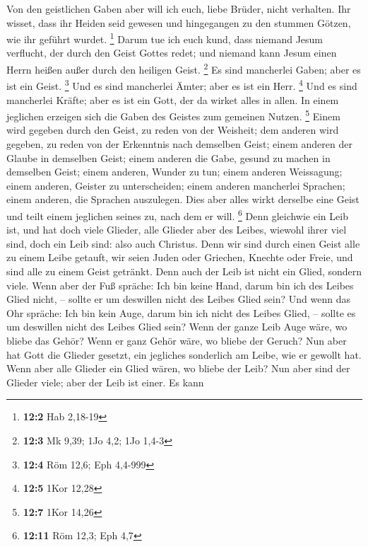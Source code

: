  Von den geistlichen Gaben aber will ich euch, liebe
Brüder, nicht verhalten.  Ihr wisset, dass ihr Heiden seid
gewesen und hingegangen zu den stummen Götzen, wie ihr geführt wurdet.
\footnote{\textbf{12:2} Hab 2,18-19}  Darum tue ich euch
kund, dass niemand Jesum verflucht, der durch den Geist Gottes redet;
und niemand kann Jesum einen Herrn heißen außer durch den heiligen
Geist. \footnote{\textbf{12:3} Mk 9,39; 1Jo 4,2; 1Jo 1,4-3}
 Es sind mancherlei Gaben; aber es ist ein Geist.
\footnote{\textbf{12:4} Röm 12,6; Eph 4,4-999}  Und es
sind mancherlei Ämter; aber es ist ein Herr. \footnote{\textbf{12:5}
  1Kor 12,28}  Und es sind mancherlei Kräfte; aber es ist
ein Gott, der da wirket alles in allen.  In einem
jeglichen erzeigen sich die Gaben des Geistes zum gemeinen Nutzen.
\footnote{\textbf{12:7} 1Kor 14,26}  Einem wird gegeben
durch den Geist, zu reden von der Weisheit; dem anderen wird gegeben, zu
reden von der Erkenntnis nach demselben Geist;  einem
anderen der Glaube in demselben Geist; einem anderen die Gabe, gesund zu
machen in demselben Geist;  einem anderen, Wunder zu tun;
einem anderen Weissagung; einem anderen, Geister zu unterscheiden; einem
anderen mancherlei Sprachen; einem anderen, die Sprachen auszulegen.
 Dies aber alles wirkt derselbe eine Geist und teilt
einem jeglichen seines zu, nach dem er will. \footnote{\textbf{12:11}
  Röm 12,3; Eph 4,7}  Denn gleichwie ein Leib ist, und
hat doch viele Glieder, alle Glieder aber des Leibes, wiewohl ihrer viel
sind, doch ein Leib sind: also auch Christus.  Denn wir
sind durch einen Geist alle zu einem Leibe getauft, wir seien Juden oder
Griechen, Knechte oder Freie, und sind alle zu einem Geist getränkt.
 Denn auch der Leib ist nicht ein Glied, sondern viele.
 Wenn aber der Fuß spräche: Ich bin keine Hand, darum bin
ich des Leibes Glied nicht, -- sollte er um deswillen nicht des Leibes
Glied sein?  Und wenn das Ohr spräche: Ich bin kein Auge,
darum bin ich nicht des Leibes Glied, -- sollte es um deswillen nicht
des Leibes Glied sein?  Wenn der ganze Leib Auge wäre, wo
bliebe das Gehör? Wenn er ganz Gehör wäre, wo bliebe der Geruch?
 Nun aber hat Gott die Glieder gesetzt, ein jegliches
sonderlich am Leibe, wie er gewollt hat.  Wenn aber alle
Glieder ein Glied wären, wo bliebe der Leib?  Nun aber
sind der Glieder viele; aber der Leib ist einer.  Es kann
